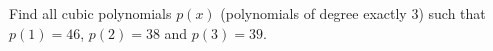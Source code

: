 Find all cubic polynomials $p(x)$ (polynomials of degree exactly $3$) such that $p(1)=46$, $p(2)=38$ and $p(3)=39$.
